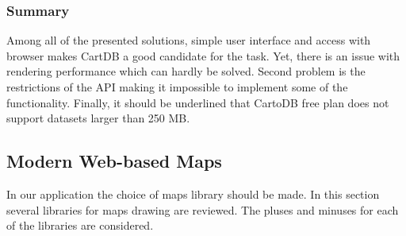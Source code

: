 \subsubsection{Summary}

Among all of the presented solutions, simple user interface and access with browser makes CartDB a
good candidate for the task. Yet, there is an issue with rendering performance which can hardly  be
solved. Second problem is the restrictions of the API making it impossible to implement some of the
functionality. Finally, it should be underlined that CartoDB free plan does not support datasets
larger than 250 MB.

\subsection{Modern Web-based Maps}
In our application the choice of maps library should be made. In this section several
libraries for maps drawing are reviewed. The pluses and minuses for each of the
libraries are considered.


